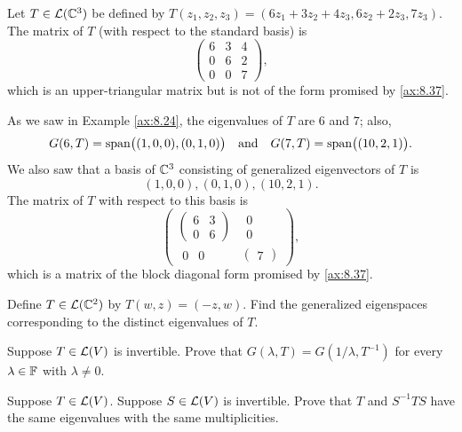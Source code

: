 \begin{example}\label{ax:8.38}
Let $T\in\mathcal{L}(\mathbb{C}^3)$ be defined by
$T(z_1,z_2,z_3)=(6z_1+3z_2+4z_3,6z_2+2z_3,7z_3)$. The matrix of $T$ (with
respect to the standard basis) is
\[ \begin{pmatrix} 6 & 3 & 4\\ 0 & 6 & 2\\ 0 & 0 & 7 \end{pmatrix}, \]
which is an upper-triangular matrix but is not of the form promised by
\ref{ax:8.37}.

As we saw in Example \ref{ax:8.24}, the eigenvalues of $T$ are $6$ and $7$;
also,
\[ G(6,T) = \operatorname{span}\bigl((1,0,0),(0,1,0)\bigr) \quad\text{and}\quad
   G(7,T) = \operatorname{span}\bigl((10,2,1)\bigr). \]
We also saw that a basis of $\mathbb{C}^3$ consisting of generalized eigenvectors of
$T$ is
\[ (1,0,0),(0,1,0),(10,2,1). \]
The matrix of $T$ with respect to this basis is
\[ \begin{pmatrix}
  \begin{pmatrix} 6 & 3\\ 0 & 6 \end{pmatrix} & \begin{matrix} 0\\ 0 \end{matrix}\\
  \begin{matrix} 0 & 0 \end{matrix} & \begin{pmatrix} 7 \end{pmatrix}
\end{pmatrix}, \]
which is a matrix of the block diagonal form promised by \ref{ax:8.37}.
\end{example}


\begin{exercise}
Define $T\in\mathcal{L}(\mathbb{C}^2)$ by $T(w,z)=(-z,w)$. Find the generalized eigenspaces
corresponding to the distinct eigenvalues of $T$.
\end{exercise}

\begin{exercise}
Suppose $T\in\mathcal{L}(V)$ is invertible. Prove that
$G(\lambda,T)=G(1/\lambda,T^{-1})$ for every $\lambda\in\mathbb{F}$
with $\lambda\ne0$.
\end{exercise}

\begin{exercise}
Suppose $T\in\mathcal{L}(V)$. Suppose $S\in\mathcal{L}(V)$ is invertible. Prove that $T$ and
$S^{-1}TS$ have the same eigenvalues with the same multiplicities.
\end{exercise}

